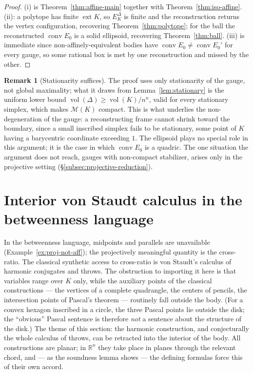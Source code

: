 \documentclass[11pt]{amsart}
\theoremstyle{definition}
\newtheorem{remark}[theorem]{Remark}
\newcommand{\R}{\mathbb{R}}
\newcommand{\conv}{\operatorname{conv}}
\newcommand{\ext}{\operatorname{ext}}
\begin{document}
\begin{proof}
(i) is Theorem~\ref{thm:affine-main} together with
Theorem~\ref{thm:iso-affine}. (ii): a polytope has finite $\ext K$, so
$E_K^\Delta$ is finite and the reconstruction returns the vertex
configuration, recovering Theorem~\ref{thm:polytope}; for the ball the
reconstructed $\conv E_0$ is a solid ellipsoid, recovering
Theorem~\ref{thm:ball}. (iii) is immediate since non-affinely-equivalent
bodies have $\conv E_0\ne\conv E_0'$ for every gauge, so some rational box is
met by one reconstruction and missed by the other.
\end{proof}

\begin{remark}[Stationarity suffices]
The proof uses only stationarity of the gauge, not global maximality; what it
draws from Lemma~\ref{lem:stationary} is the uniform lower bound
$\operatorname{vol}(\Delta)\ge\operatorname{vol}(K)/n^n$, valid for every
stationary simplex, which makes $\mathcal M(K)$ compact. This is what underlies the
non-degeneration of the gauge: a reconstructing frame cannot
shrink toward the boundary, since a small inscribed simplex fails to be
stationary, some point of $K$ having a barycentric coordinate exceeding $1$.
The ellipsoid plays no special role in this argument; it is the case in which
$\conv E_0$ is a quadric. The one situation the argument does not reach,
gauges with non-compact stabilizer, arises only in the projective setting
(\S\ref{subsec:projective-reduction}).
\end{remark}

\section{Interior von Staudt calculus in the betweenness language}
\label{sec:vonstaudt}

In the betweenness language, midpoints and parallels are unavailable
(Example~\ref{ex:proj-not-aff}); the projectively meaningful quantity is the
cross-ratio. The classical synthetic access to cross-ratio is von Staudt's
calculus of harmonic conjugates and throws. The obstruction to importing it
here is that variables range over $K$ only, while the auxiliary points of the
classical constructions --- the vertices of a complete quadrangle, the centers
of pencils, the intersection points of Pascal's theorem --- routinely fall
outside the body. (For a convex hexagon inscribed in a circle, the three
Pascal points lie outside the disk; the ``obvious'' Pascal sentence is
therefore \emph{not} a sentence about the structure of the disk.) The theme
of this section: the harmonic construction, and conjecturally the whole
calculus of throws, can be retracted into the interior of the body. All
constructions are planar; in $\R^n$ they take place in planes through the
relevant chord, and --- as the soundness lemma shows --- the defining formulas
force this of their own accord.
\end{document}
